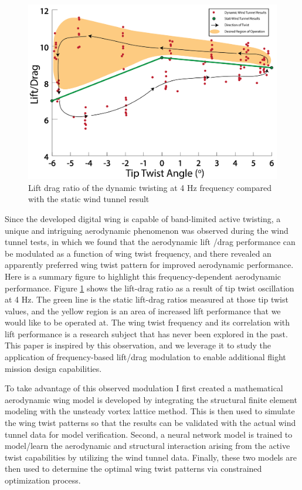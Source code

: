 \documentclass[11pt]{ucthesis}
\begin{document}
\begin{figure}[h]
\centering
\includegraphics[width=1\linewidth]{./Figures/LD5454MotivationPlot.png}
\caption{Lift drag ratio of the dynamic twisting at 4 Hz frequency compared with the static wind tunnel result}
\label{fig:LDmot}
\end{figure}

Since the developed digital wing is capable of band-limited active twisting, a unique and intriguing aerodynamic phenomenon was observed during the wind tunnel tests, in which we found that the aerodynamic lift /drag performance can be modulated as a function of wing twist frequency, and there revealed an apparently preferred wing twist pattern for improved aerodynamic performance. Here is a summary figure to highlight this frequency-dependent aerodynamic performance. Figure \ref{fig:LDmot} shows the lift-drag ratio as a result of tip twist oscillation at 4 Hz. The green line is the static lift-drag ratios measured at those tip twist values, and the yellow region is an area of increased lift performance that we would like to be operated at. The wing twist frequency and its correlation with lift performance is a research subject that has never been explored in the past. This paper is inspired by this observation, and we leverage it to study the application of frequency-based lift/drag modulation to enable additional flight mission design capabilities. 

To take advantage of this observed modulation I first created a mathematical aerodynamic wing model is developed by integrating the structural finite element modeling with the unsteady vortex lattice method. This is then used to simulate the wing twist patterns so that the results can be validated with the actual wind tunnel data for model verification. Second, a neural network model is trained to model/learn the aerodynamic and structural interaction arising from the active twist capabilities by utilizing the wind tunnel data. Finally, these two models are then used to determine the optimal wing twist patterns via constrained optimization process.
\end{document}
